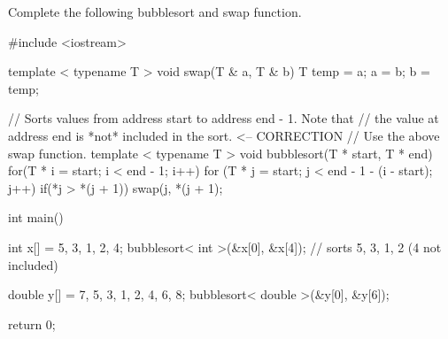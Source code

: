 

\nextq
Complete the following bubblesort and swap function.
\\
\ANSWER
\begin{answercode}
#include <iostream>

template < typename T >
void swap(T & a, T & b)
{
  T temp = a;
  a = b;
  b = temp;
}

// Sorts values from address start to address end - 1. Note that
// the value at address end is *not* included in the sort. <-- CORRECTION
// Use the above swap function.
template < typename T >
void bubblesort(T * start, T * end)
{
  for(T * i = start; i < end - 1; i++)
  {
    for (T * j = start; j < end - 1 - (i - start); j++)
    {
      if(*j > *(j + 1))
      {
        swap(j, *(j + 1);
      }
    }
  }
}

int main()
{
    int x[] = {5, 3, 1, 2, 4};
    bubblesort< int >(&x[0], &x[4]); // sorts {5, 3, 1, 2} (4 not included)

    double y[] = {7, 5, 3, 1, 2, 4, 6, 8};
    bubblesort< double >(&y[0], &y[6]);

    return 0;
}
\end{answercode}

